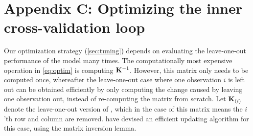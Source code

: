 \documentclass[a4paper]{vanvliet_paper}
\newcommand{\modcov}{\widetilde{\Sigma}_{\mat{X}}}
\begin{document}
\section*{Appendix C: Optimizing the inner cross-validation loop}\label{appendixC}

Our optimization strategy (\autoref{sec:tuning}) depends on evaluating the leave-one-out performance of the model many times.
%
The computationally most expensive operation in \autoref{eq:optim} is computing $\mathbf{K}^{-1}$.
However, this matrix only needs to be computed once, whereafter the leave-one-out case where one observation $i$ is left out
can be obtained efficiently by only computing the change caused by leaving one observation out, instead of re-computing the matrix from scratch.
Let $\mathbf{K}_{(i)}$ denote the leave-one-out version of , which in the case of this matrix means the $i$'th row and column are removed.
\textcite{Salmen2010} have devised an efficient updating algorithm for this case, using the matrix inversion lemma.
\end{document}
